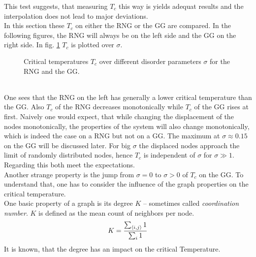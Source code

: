     This test suggests, that measuring \(T_c\) this way is yields
    adequat results and the interpolation does not lead to major
    deviations.\\
    In this section these \(T_c\) on either the RNG or the GG are
    compared. In the following figures, the RNG will always be on the
    left side and the GG on the right side.
    In fig. \ref{fig:Tc} \(T_c\) is plotted over \(\sigma\).
    \begin{figure}[htbp]
        \centering
        \caption[Critical Temperature over Different Disorder Parameters]
        {
            Critical temperatures \(T_c\) over different
            disorder parameters \(\sigma\) for
             the RNG and
             the GG.\\
        }
        \label{fig:Tc}
    \end{figure}\\
    One sees that the RNG on the left has generally a lower critical
    temperature than the GG. Also \(T_c\) of the RNG decreases
    monotonically while \(T_c\) of the GG rises at first. Naively one would
    expect, that while changing the displacement of the nodes monotonically,
    the properties of the system will also change monotonically, which is
    indeed the case on a RNG but not on a GG. The
    maximum at \(\sigma \approx 0.15\) on the GG will be discussed later.
    For big \(\sigma\) the displaced nodes approach the limit of randomly
    distributed nodes, hence \(T_c\) is independent of \(\sigma\) for
    \(\sigma \gg 1\). Regarding this both meet the expectations.\\
    Another strange property is the jump from \(\sigma = 0\) to \(\sigma > 0\)
    of \(T_c\) on the GG. To understand that, one has to
    consider the influence of the graph properties on the critical
    temperature.\\
    One basic property of a graph is its degree \(K\) -- sometimes
    called \emph{coordination number}. \(K\) is defined as the mean count
    of neighbors per node.
    \begin{equation}
        K = \frac{\sum_{\left< i,j \right>} 1}{\sum_{i} 1}
        \label{eq:degree}
    \end{equation}
    It is known, that the degree has an impact on the critical Temperature.
